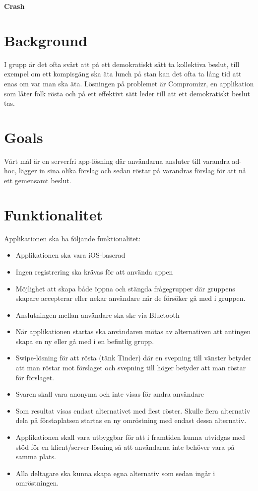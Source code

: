 \documentclass[10pt]{article}
\date{}
\begin{document}

\begin{center}
{\Large
\textbf{Crash}
}
\end{center}




\section*{Background}
\sloppy
\noindent I grupp är det ofta svårt att på ett demokratiskt sätt ta kollektiva beslut, till exempel om ett kompisgäng ska äta lunch på stan kan det ofta ta lång tid att enas om var man ska äta. Lösningen på problemet är Compromizr, en applikation som låter folk rösta och på ett effektivt sätt leder till att ett demokratiskt beslut tas. 

\section*{Goals}
\sloppy
\noindent Vårt mål är en serverfri app-lösning där användarna ansluter till varandra ad-hoc, lägger in sina olika förslag och sedan röstar på varandras förslag för att nå ett gemensamt beslut.

\section*{Funktionalitet}
\sloppy
\noindent Applikationen ska ha följande funktionalitet: 
\begin{itemize}
	\setlength\itemsep{0.1em}
	\item Applikationen ska vara iOS-baserad
	\item Ingen registrering ska krävas för att använda appen
	\item Möjlighet att skapa både öppna och stängda frågegrupper där gruppens skapare accepterar eller nekar användare när de försöker gå med i gruppen.
	\item Anslutningen mellan användare ska ske via Bluetooth
    \item När applikationen startas ska användaren mötas av alternativen att antingen skapa en ny eller gå med i en befintlig grupp.
    \item Swipe-lösning för att rösta (tänk Tinder) där en svepning till vänster betyder att man röstar mot förslaget och svepning till höger betyder att man röstar för förslaget.
    \item Svaren skall vara anonyma och inte visas för andra användare
    \item Som resultat visas endast alternativet med flest röster. Skulle flera alternativ dela på förstaplatsen startas en ny omröstning med endast dessa alternativ. 
    \item Applikationen skall vara utbyggbar för att i framtiden kunna utvidgas med stöd för en klient/server-lösning så att användarna inte behöver vara på samma plats.
    \item Alla deltagare ska kunna skapa egna alternativ som sedan ingår i omröstningen.
\end{itemize}
\end{document}
